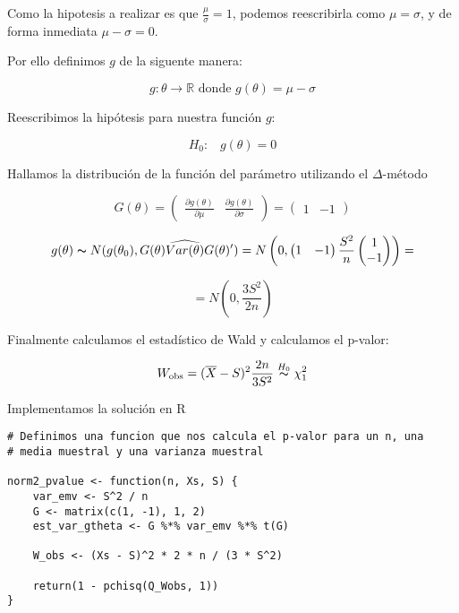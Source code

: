 Como la hipotesis a realizar es que $\frac{\mu}{\sigma} = 1$, podemos reescribirla como $\mu = \sigma$, y de forma inmediata $\mu - \sigma = 0$.

Por ello definimos $g$ de la siguente manera:

\[
    g: \theta \longrightarrow \mathbb{R} \text{ donde } g(\theta) = \mu - \sigma
\]

Reescribimos la hipótesis para nuestra función $g$:

\[
    H_0\text{:}\quad g(\theta) = 0
\]

\newpage

Hallamos la distribución de la función del parámetro utilizando el $\Delta$-método

\[
    G(\theta) = \begin{pmatrix}\frac{\partial g(\theta)}{\partial \mu}  & \frac{\partial g(\theta)}{\partial \sigma}\end{pmatrix} = \begin{pmatrix}1 & -1\end{pmatrix}
\]

\[
    g(\theta) \thicksim N(g(\theta_0),G(\theta)\widehat{Var(\theta)}G(\theta)') = N\left(0, \begin{pmatrix}1 & -1\end{pmatrix} \frac{S^2}{n} \begin{pmatrix}1 \\ -1\end{pmatrix}\right) =
\]

\[
    = N(0, \frac{3S^2}{2n})
\]

Finalmente calculamos el estadístico de Wald y calculamos el p-valor:

\[
    W_{\text{obs}} = (\overline{X} - S)^2 \frac{2n}{3S^2} \overset{H_0}{\thicksim} \chi^2_1
\]

\vspace{2ex}

\Large{Implementamos la solución en R}

\begin{lstlisting}
# Definimos una funcion que nos calcula el p-valor para un n, una 
# media muestral y una varianza muestral

norm2_pvalue <- function(n, Xs, S) {
    var_emv <- S^2 / n
    G <- matrix(c(1, -1), 1, 2)
    est_var_gtheta <- G %*% var_emv %*% t(G)

    W_obs <- (Xs - S)^2 * 2 * n / (3 * S^2)

    return(1 - pchisq(Q_Wobs, 1))
}
\end{lstlisting}

